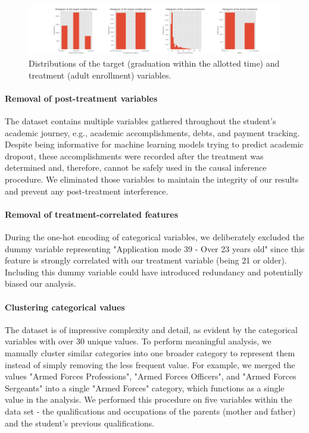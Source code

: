 \documentclass{article}
\begin{document}
\begin{figure}
    \centering
    \caption{\small{Distributions of the target (graduation within the allotted time) and treatment (adult enrollment) variables.}}
    \label{fig:target_and_treatments_histograms}
    \includegraphics[width = \textwidth]{plots/target_and_treatments_histograms.png}
\end{figure}

\paragraph{Removal of post-treatment variables} The dataset contains multiple variables gathered throughout the student's academic journey, e.g., academic accomplishments, debts, and payment tracking. Despite being informative for machine learning models trying to predict academic dropout, these accomplishments were recorded after the treatment was determined and, therefore, cannot be safely used in the causal inference procedure. We eliminated those variables to maintain the integrity of our results and prevent any post-treatment interference.

\paragraph{Removal of treatment-correlated features} During the one-hot encoding of categorical variables, we deliberately excluded the dummy variable representing "Application mode 39 - Over 23 years old" since this feature is strongly correlated with our treatment variable (being 21 or older). Including this dummy variable could have introduced redundancy and potentially biased our analysis.

\paragraph{Clustering categorical values} The dataset is of impressive complexity and detail, as evident by the categorical variables with over 30 unique values. To perform meaningful analysis, we manually cluster similar categories into one broader category to represent them instead of simply removing the less frequent value. For example, we merged the values "Armed Forces Professions", "Armed Forces Officers", and "Armed Forces Sergeants" into a single "Armed Forces" category, which functions as a single value in the analysis. We performed this procedure on five variables within the data set - the qualifications and occupations of the parents (mother and father) and the student's previous qualifications. 
\end{document}
